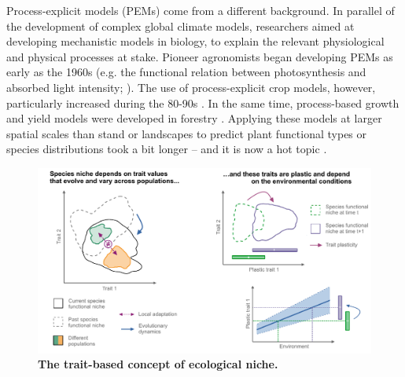 Process-explicit models (PEMs) come from a different background. In parallel of the development of complex global climate models, researchers aimed at developing mechanistic models in biology, to explain the relevant physiological and physical processes at stake. Pioneer agronomists began developing PEMs as early as the 1960s (e.g. the functional relation between photosynthesis and absorbed light intensity; \citealp{Wit1965}).
The use of process-explicit crop models, however, particularly increased during the 80-90s \citep{Bouman1996}. In the same time, process-based growth and yield models were developed in forestry \citep{Botkin1972}. Applying these models at larger spatial scales than stand or landscapes to predict plant functional types or species distributions took a bit longer \citep{Sitch2003, Chuine2001} -- and it is now a hot topic \citep{Evans2016, Pilowsky2022}. 

\begin{figure}[h]
\hspace*{-0.8cm}
\centering
\includegraphics{0introduction/figs/functional_niche.pdf}
\caption{\textbf{The trait-based concept of ecological niche.}}
\vspace*{-0.2cm}
\label{fig:funcniche}
\end{figure}


